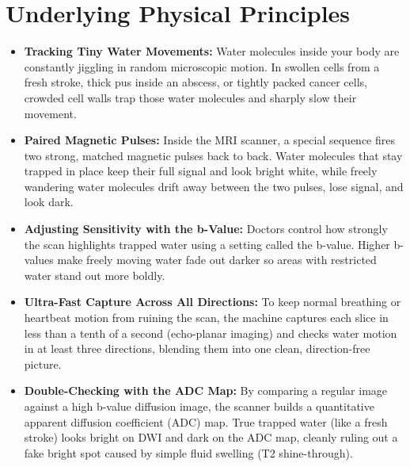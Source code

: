 \section{Underlying Physical Principles}
\begin{itemize}
\item \textbf{Tracking Tiny Water Movements:} Water molecules inside your body are constantly jiggling in random microscopic motion. In swollen cells from a fresh stroke, thick pus inside an abscess, or tightly packed cancer cells, crowded cell walls trap those water molecules and sharply slow their movement.
\item \textbf{Paired Magnetic Pulses:} Inside the MRI scanner, a special sequence fires two strong, matched magnetic pulses back to back. Water molecules that stay trapped in place keep their full signal and look bright white, while freely wandering water molecules drift away between the two pulses, lose signal, and look dark.
\item \textbf{Adjusting Sensitivity with the b-Value:} Doctors control how strongly the scan highlights trapped water using a setting called the b-value. Higher b-values make freely moving water fade out darker so areas with restricted water stand out more boldly.
\item \textbf{Ultra-Fast Capture Across All Directions:} To keep normal breathing or heartbeat motion from ruining the scan, the machine captures each slice in less than a tenth of a second (echo-planar imaging) and checks water motion in at least three directions, blending them into one clean, direction-free picture.
\item \textbf{Double-Checking with the ADC Map:} By comparing a regular image against a high b-value diffusion image, the scanner builds a quantitative apparent diffusion coefficient (ADC) map. True trapped water (like a fresh stroke) looks bright on DWI and dark on the ADC map, cleanly ruling out a fake bright spot caused by simple fluid swelling (T2 shine-through).
\end{itemize}

